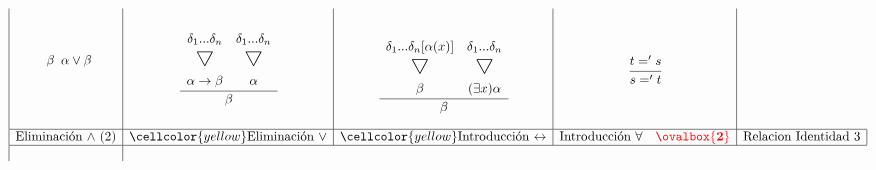 \documentclass[a4paper, 10pt]{article}
\newcommand\triangulo{\scaleobj{1.6}{\bigtriangledown}}
\begin{document}
\begin{equation*}
\begin{array}{|c|c|c|c|c|}
\begin{matrix}
{\begin{matrix}
\begin{array}{c}
        \beta
      \end{array} \\
    \end{matrix}}{\alpha \vee \beta}
  \\
  \ 
\end{matrix}
&
\begin{matrix}
  \cfrac{
    \begin{matrix}
      \begin{array}{cc}
      \ \\
        \delta_1 ... \delta_n & \delta_1 ... \delta_n \\
        \triangulo & \triangulo \vspace{2mm}\\
        \alpha \rightarrow \beta & \alpha
      \end{array} \\
    \end{matrix}}{\beta} \\
  \ 
\end{matrix}
&
\begin{matrix}
  \\
  \cfrac{
    \begin{matrix}
      \begin{array}{cc}
      \ \\
        \delta_1 ... \delta_n [\alpha(x)] & \delta_1 ... \delta_n \\
        \triangulo & \triangulo \vspace{2mm}\\
        \beta & (\exists x)\alpha
      \end{array} \\
    \end{matrix}}{\beta}
  \\
  \
\end{matrix}
&
  \begin{matrix}
  \\
  \cfrac{t =' s}{s =' t} \\
  \\
  \end{matrix}
\\ \hline
    \text{Eliminación $\wedge$ (2)} &
    \cellcolor{yellow}\text{Eliminación $\vee$} &
    \cellcolor{yellow}\text{Introducción $\leftrightarrow$} &
    \text{Introducción $\forall$} \hspace{1em} \textcolor{red}{\ovalbox{\textbf{2}}} &
    \text{Relacion Identidad 3}
\\ \hline
\begin{matrix}

\end{matrix}
\end{array}
\end{equation*}
\end{document}
